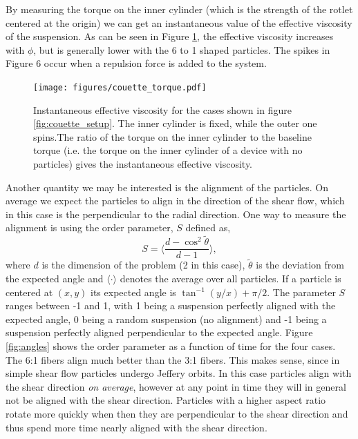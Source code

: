 \documentclass[preprint, 10pt]{elsarticle}
\begin{document}
By measuring the torque on the inner cylinder (which is the strength of the
rotlet centered at the origin) we can get an instantaneous value of the
effective viscosity of the suspension. As can be seen in Figure
\ref{fig:torque}, the effective viscosity increases with $\phi$, but is
generally lower with the 6 to 1 shaped particles. The spikes in Figure 6 occur
when a repulsion force is added to the system.
\begin{figure}[!h]
\begin{center}
\texttt{[image: figures/couette\_torque.pdf]}\\
\end{center}
\caption{Instantaneous effective viscosity for the cases shown in figure
\ref{fig:couette_setup}. The inner cylinder is fixed, while the outer one spins.The ratio of the torque on the inner cylinder to the baseline torque (i.e. the
torque on the inner cylinder of a device with no particles) gives the
instantaneous effective viscosity.}\label{fig:torque}
\end{figure} 

Another quantity we may be interested is the alignment of the particles. On
average we expect the particles to align in the direction of the shear flow,
which in this case is the perpendicular to the radial direction. One way to measure the alignment is using the order parameter, $S$ defined as,
\[ S = \langle \frac{d - \cos^2\tilde{\theta}}{d - 1}\rangle,\]
where $d$ is the dimension of the problem (2 in this case), $\tilde{\theta}$ is the deviation from the expected angle and $\langle \cdot\rangle$ denotes the average over all particles. If a particle is centered at $(x,y)$ its expected angle is $\tan^{-1}(y/x) + \pi/2$. The parameter $S$ ranges between -1 and 1, with 1 being a suspension perfectly aligned with the expected angle, 0 being a random suspension (no alignment) and -1 being a suspension perfectly aligned perpendicular to the expected angle. Figure \ref{fig:angles}
shows the order parameter as a function of time for the four cases. The 6:1 fibers align much better than the 3:1 fibers. This makes sense, since in simple shear flow particles undergo Jeffery orbits. In this case particles align with the shear direction \textit{on average}, however at any point in time they will in general not be aligned with the shear direction. Particles with a higher aspect ratio rotate more quickly when then they are perpendicular to the shear direction and thus spend more time nearly aligned with the shear direction.
\end{document}
